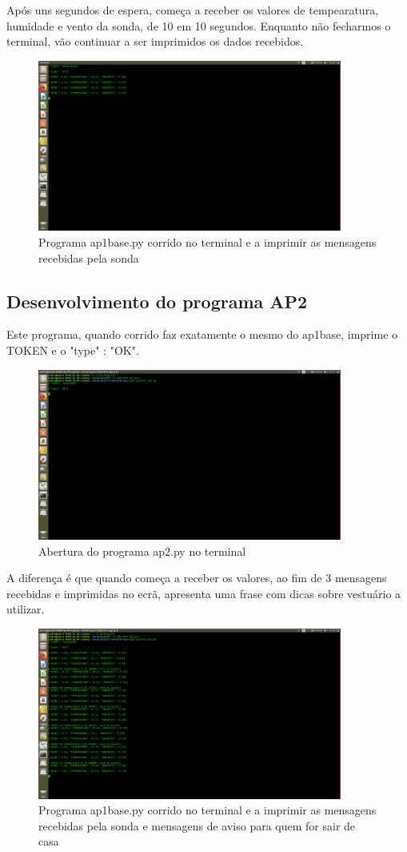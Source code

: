 \documentclass{report}
\begin{document}
Após uns segundos de espera, começa a receber os valores de tempearatura, humidade e vento da sonda, de 10 em 10 segundos. Enquanto não fecharmos o terminal, vão continuar a ser imprimidos os dados recebidos.

\begin{figure}[h]
\center
\includegraphics[width=10cm]{Imagens/2.png}
\caption{Programa ap1base.py corrido no terminal e a imprimir as mensagens recebidas pela sonda}
\end{figure}

\subsection{Desenvolvimento do programa AP2}
Este programa, quando corrido faz exatamente o mesmo do ap1base, imprime o TOKEN e o "type" : "OK".

\begin{figure}[h]
\center
\includegraphics[width=10cm]{Imagens/3.png}
\caption{Abertura do programa ap2.py no terminal}
\end{figure}

A diferença é que quando começa a receber os valores, ao fim de 3 mensagens recebidas e imprimidas no ecrã, apresenta uma frase com dicas sobre vestuário a utilizar.

\begin{figure}[h]
\center
\includegraphics[width=10cm]{Imagens/4.png}
\caption{Programa ap1base.py corrido no terminal e a imprimir as mensagens recebidas pela sonda e mensagens de aviso para quem for sair de casa}
\end{figure}
\end{document}
